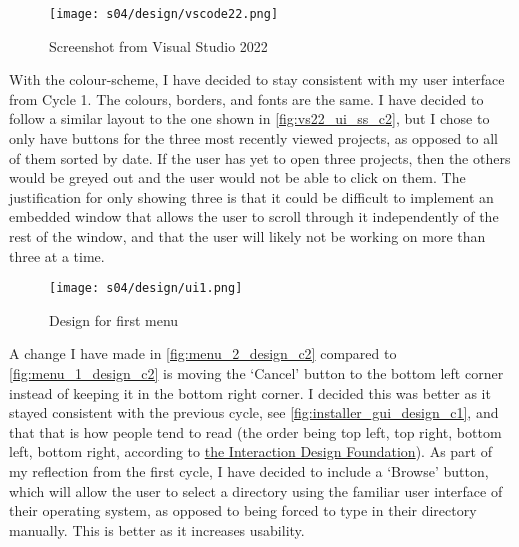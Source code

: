         \begin{figure}[!ht]
            \centering
            \texttt{[image: s04/design/vscode22.png]}
            \caption{Screenshot from Visual Studio 2022}
            \label{fig:vs22_ui_ss_c2}
        \end{figure}

        With the colour-scheme, I have decided to stay consistent with my user interface from Cycle 1. The colours, borders, and fonts are the same. 
        I have decided to follow a similar layout to the one shown in \autoref{fig:vs22_ui_ss_c2}, but I chose to only have buttons for the three most recently viewed projects, as opposed to all of them sorted by date. 
        If the user has yet to open three projects, then the others would be greyed out and the user would not be able to click on them. 
        The justification for only showing three is that it could be difficult to implement an embedded window that allows the user to scroll through it independently of the rest of the window, and that the user will likely not be working on more than three at a time. 

        \begin{figure}[!ht]
            \centering
            \texttt{[image: s04/design/ui1.png]}
            \caption{Design for first menu}
            \label{fig:menu_1_design_c2}
        \end{figure}

        A change I have made in \autoref{fig:menu_2_design_c2} compared to \autoref{fig:menu_1_design_c2} is moving the `Cancel' button to the bottom left corner instead of keeping it in the bottom right corner. 
        I decided this was better as it stayed consistent with the previous cycle, see \autoref{fig:installer_gui_design_c1}, and that that is how people tend to read (the order being top left, top right, bottom left, bottom right, according to \href{https://www.interaction-design.org/literature/article/visual-hierarchy-organizing-content-to-follow-natural-eye-movement-patterns}{the Interaction Design Foundation}). 
        As part of my reflection from the first cycle, I have decided to include a `Browse' button, which will allow the user to select a directory using the familiar user interface of their operating system, as opposed to being forced to type in their directory manually. 
        This is better as it increases usability. 

